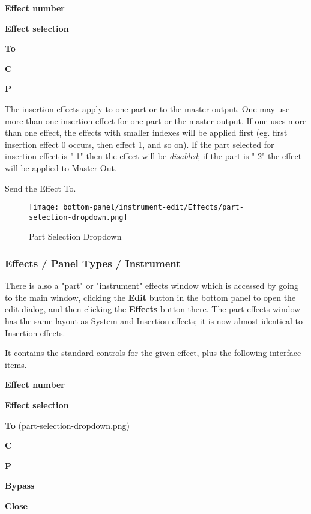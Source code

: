    \begin{enumber}
      \item \textbf{Effect number}
      \item \textbf{Effect selection}
      \item \textbf{To}
      \item \textbf{C}
      \item \textbf{P}
   \end{enumber}

   The insertion effects apply to one part or to the master output.
   One may use more
   than one insertion effect for one part or the master output.
   If one uses more than one effect, the
   effects with smaller indexes will be applied first (eg. first insertion
   effect 0 occurs, then effect 1, and so on).
   If the part selected for insertion
   effect is "-1" then the effect will be \textsl{disabled};
   if the part is "-2" the
   effect will be applied to Master Out. 

   \setcounter{ItemCounter}{0}      %

   Send the Effect To.

\begin{figure}[H]
   \centering 
   \texttt{[image: bottom-panel/instrument-edit/Effects/part-selection-dropdown.png]}
   \caption{Part Selection Dropdown}
   \label{fig:sample_part_selection_dropdown}
\end{figure}

\subsubsection{Effects / Panel Types / Instrument }
\label{subsubsec:effects_paneltypes_instrument}

   There is also a "part" or "instrument" effects window which is accessed
   by going to the main window, clicking the \textbf{Edit} button in the
   bottom panel to open the edit dialog, and then clicking the
   \textbf{Effects} button there.  The part effects window has the
   same layout as System and Insertion effects; it is now almost identical
   to Insertion effects.

   It contains the standard controls for the given effect, plus the
   following interface items.

   \begin{enumber}
      \item \textbf{Effect number}
      \item \textbf{Effect selection}
      \item \textbf{To} (part-selection-dropdown.png)
      \item \textbf{C}
      \item \textbf{P}
      \item \textbf{Bypass}
      \item \textbf{Close}
   \end{enumber}

